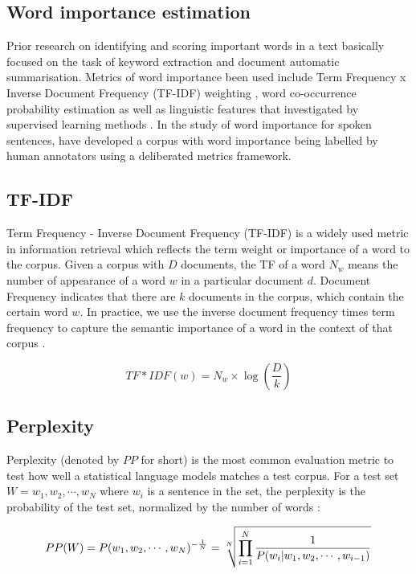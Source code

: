 \subsection{Word importance estimation}

Prior research on identifying and scoring important words in a text basically focused on the task of keyword extraction and document automatic summarisation. Metrics of word importance been used include Term Frequency x Inverse Document Frequency (TF-IDF) weighting \citep{HaCohen-Kerner2010}, word co-occurrence probability estimation \citep{Y.MATSUO2004} as well as linguistic features that investigated by supervised learning methods \citep{Liu2011, I.Sheeba2012}. In the study of word importance for spoken sentences, \citet{Kafle2018} have developed a corpus with word importance being labelled by human annotators using a deliberated metrics framework.

\subsection{TF-IDF}
Term Frequency - Inverse Document Frequency (TF-IDF) is a widely used metric in information retrieval which reflects the term weight or importance of a word to the corpus. Given a corpus with $D$ documents, the TF of a word $N_w$ means the number of appearance of a word $w$ in a particular document $d$. Document Frequency indicates that there are $k$ documents in the corpus, which contain the certain word $w$. In practice, we use the inverse document frequency times term frequency to capture the semantic importance of a word in the context of that corpus \citep{Jurafsky2008}.

\begin{equation}
TF*IDF(w) = N_w \times \log(\frac{D}{k})
\label{eq:tf-idf}
\end{equation}

\subsection{Perplexity}
Perplexity (denoted by $PP$ for short) is the most common evaluation metric to test how well a statistical language models matches a test corpus.  For a test set $W = {w_1, w_2, \cdots, w_N}$ where $w_i$ is a sentence in the set, the perplexity is the probability of the test set, normalized by the number of words \citep{Jurafsky2008}:

\begin{equation}
PP(W) = P(w_1, w_2, \cdots, w_N)^{-\frac{1}{N}}\\
= \sqrt[N]{\prod_{i=1}^{N} \frac{1}{P(w_i|w_1, w_2,\cdots, w_{i-1})}}
\label{eq:perplexity}
\end{equation}

